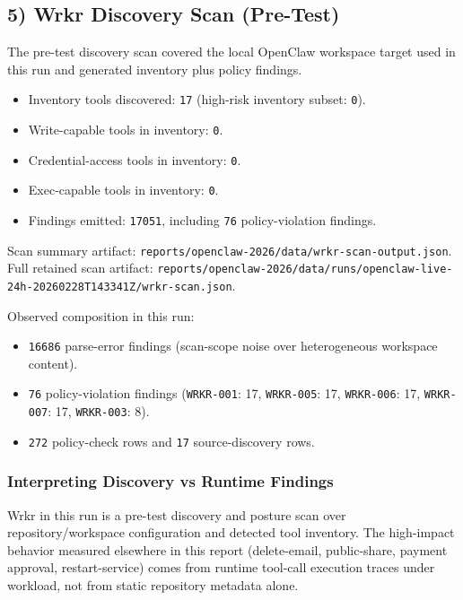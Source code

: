 \documentclass[
]{article}
\providecommand{\tightlist}{%
  \setlength{\itemsep}{0pt}\setlength{\parskip}{0pt}}
\begin{document}
\subsection{5) Wrkr Discovery Scan
(Pre-Test)}\label{5-wrkr-discovery-scan-pre-test}

The pre-test discovery scan covered the local OpenClaw workspace target
used in this run and generated inventory plus policy findings.

\begin{itemize}
\tightlist
\item
  Inventory tools discovered: \texttt{17} (high-risk inventory subset:
  \texttt{0}).
\item
  Write-capable tools in inventory: \texttt{0}.
\item
  Credential-access tools in inventory: \texttt{0}.
\item
  Exec-capable tools in inventory: \texttt{0}.
\item
  Findings emitted: \texttt{17051}, including \texttt{76}
  policy-violation findings.
\end{itemize}

Scan summary artifact:
\texttt{reports/openclaw-2026/data/wrkr-scan-output.json}. Full retained
scan artifact:
\texttt{reports/openclaw-2026/data/runs/openclaw-live-24h-20260228T143341Z/wrkr-scan.json}.

Observed composition in this run:

\begin{itemize}
\tightlist
\item
  \texttt{16686} parse-error findings (scan-scope noise over
  heterogeneous workspace content).
\item
  \texttt{76} policy-violation findings (\texttt{WRKR-001}: 17,
  \texttt{WRKR-005}: 17, \texttt{WRKR-006}: 17, \texttt{WRKR-007}: 17,
  \texttt{WRKR-003}: 8).
\item
  \texttt{272} policy-check rows and \texttt{17} source-discovery rows.
\end{itemize}

\subsubsection{Interpreting Discovery vs Runtime
Findings}\label{interpreting-discovery-vs-runtime-findings}

Wrkr in this run is a pre-test discovery and posture scan over
repository/workspace configuration and detected tool inventory. The
high-impact behavior measured elsewhere in this report (delete-email,
public-share, payment approval, restart-service) comes from runtime
tool-call execution traces under workload, not from static repository
metadata alone.
\end{document}
